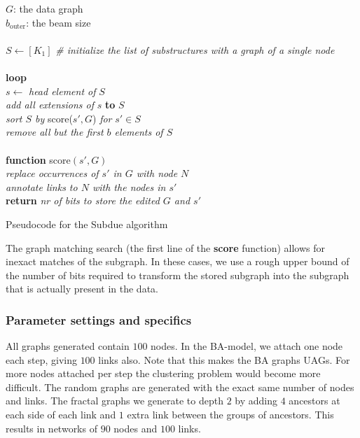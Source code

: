 \documentclass{article}
\begin{document}
\begin{pseudo}
{
	$G$: the data graph \\
	$b_{\mbox{outer}}$: the beam size \\
	\\
	$S \leftarrow [K_1]$ \textit{\#  initialize the list of substructures with a graph of a single node} \\
	\\
	\textbf{loop} \\
	\hspace*{5mm} $s \leftarrow $ \textit{head element of} $S$ \\
	\hspace*{5mm} \textit{add all extensions of} $s$ \textbf{to} $S$ 
	\\
	\hspace*{5mm}\textit{sort $S$ by} score($s', G$) \textit{for} $s' \in S$\\
	\hspace*{5mm}\textit{remove all but the first $b$ elements of $S$} \\
	\\
	\textbf{function} score$(s', G)$\\
	\hspace*{5mm} \textit{replace occurrences of $s'$ in $G$ with node $N$}\\
	\hspace*{5mm} \textit{annotate links to $N$ with the nodes in $s'$}\\
	\hspace*{5mm} \textbf{return} \textit{nr of bits to store the edited $G$ and $s'$ }\\
}	
	\caption{Pseudocode for the Subdue algorithm}
	\label{pseudo:algorithm}
\end{pseudo}

The graph matching search (the first line of the \textbf{score} function) allows for inexact matches of the subgraph. In these cases, we use a rough upper bound of the number of bits required to transform the stored subgraph into the subgraph that is actually present in the data.

\subsubsection*{Parameter settings and specifics}

All graphs generated contain $100$ nodes. In the BA-model, we attach one node each step, giving $100$ links also. Note that this makes the BA graphs UAGs. For more nodes attached per step the clustering problem would become more difficult. The random graphs are generated with the exact same number of nodes and links. The fractal graphs we generate to depth $2$ by adding $4$ ancestors at each side of each link and $1$ extra link between the groups of ancestors. This results in networks of $90$ nodes and $100$ links.
\end{document}
